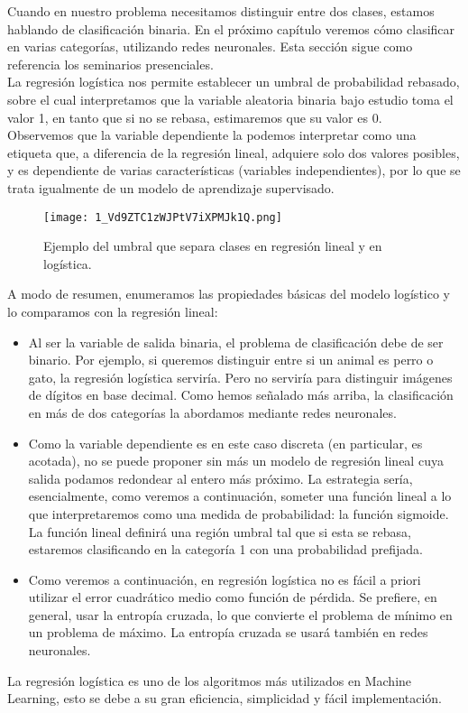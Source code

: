 \documentclass[a4paper,11pt]{article}
\begin{document}
\noindent
Cuando en nuestro problema necesitamos distinguir entre dos clases, estamos hablando de clasificación binaria. En el próximo
capítulo veremos cómo clasificar en varias categorías, utilizando redes neuronales. Esta sección sigue como referencia los seminarios presenciales.\\

\noindent
La regresión logística nos permite establecer un umbral de probabilidad rebasado, sobre el cual interpretamos que la variable aleatoria binaria bajo estudio toma el valor
1, en tanto que si no se rebasa, estimaremos que su valor es 0.\\

\noindent
Observemos que la variable dependiente la podemos interpretar como una etiqueta que, a diferencia de la regresión lineal, adquiere solo dos valores posibles,
y es dependiente de varias características (variables independientes), por lo que
se trata igualmente de un modelo de aprendizaje supervisado.

\begin{figure}[H]
\centering
\texttt{[image: 1\_Vd9ZTC1zWJPtV7iXPMJk1Q.png]}
\caption{Ejemplo del umbral que separa clases en regresión lineal y en logística.}
\end{figure}
\noindent
A modo de resumen, enumeramos las propiedades básicas del modelo logístico y lo comparamos con la regresión lineal:

\begin{itemize}
\item Al ser la variable de salida binaria, el problema de clasificación debe de ser binario. Por ejemplo, si queremos distinguir entre si un animal es perro o gato, la regresión logística serviría. Pero no serviría para distinguir imágenes de dígitos en base decimal. Como hemos señalado más arriba, la clasificación en más de dos categorías la abordamos mediante redes neuronales.
\item Como la variable dependiente es en este caso discreta (en particular, es acotada), no se puede proponer sin más un modelo de regresión lineal cuya salida
podamos redondear al entero más próximo. La estrategia sería, esencialmente,
como veremos a continuación, someter una función lineal a lo que interpretaremos como una medida de probabilidad: la función sigmoide. La función lineal
definirá una región umbral tal que si esta se rebasa, estaremos clasificando en la
categoría 1 con una probabilidad prefijada.

\item Como veremos a continuación, en regresión logística no es fácil a priori utilizar el error cuadrático medio como función de pérdida. Se prefiere, en general,
usar la entropía cruzada, lo que convierte el problema de mínimo en un problema
de máximo. La entropía cruzada se usará también en redes neuronales.

\end{itemize}
La regresión logística es uno de los algoritmos más utilizados en Machine Learning, esto se debe a su gran eficiencia, simplicidad y fácil implementación.\\
\end{document}

